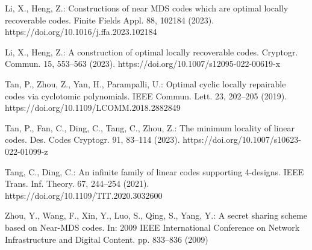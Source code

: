 \documentclass[10pt]{article}%
\begin{document}
\begin{thebibliography}{}
		 Li, X., Heng, Z.: Constructions of near MDS codes which are optimal locally recoverable codes. Finite Fields Appl. 88, 102184 (2023). https://doi.org/10.1016/j.ffa.2023.102184
		
		 Li, X., Heng, Z.: A construction of optimal locally recoverable codes. Cryptogr. Commun. 15, 553–563 (2023). https://doi.org/10.1007/s12095-022-00619-x
		
		 Tan, P., Zhou, Z., Yan, H., Parampalli, U.: Optimal cyclic locally repairable codes via cyclotomic polynomials. IEEE Commun. Lett. 23, 202–205 (2019). https://doi.org/10.1109/LCOMM.2018.2882849
		
		 Tan, P., Fan, C., Ding, C., Tang, C., Zhou, Z.: The minimum locality of linear codes. Des. Codes Cryptogr. 91, 83–114 (2023). https://doi.org/10.1007/s10623-022-01099-z
		
		 Tang, C., Ding, C.: An infinite family of linear codes supporting 4-designs. IEEE Trans. Inf. Theory. 67, 244–254 (2021). https://doi.org/10.1109/TIT.2020.3032600
		
		 Zhou, Y., Wang, F., Xin, Y., Luo, S., Qing, S., Yang, Y.: A secret sharing scheme based on Near-MDS codes. In: 2009 IEEE International Conference on Network Infrastructure and Digital Content. pp. 833–836 (2009)
		
	\end{thebibliography}
	
	
\end{document}
